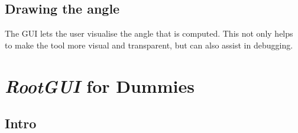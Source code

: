 \subsection{Drawing the angle}
The GUI lets the user visualise the angle that is computed. This not only helps to make the tool more visual and transparent, but can also assist in debugging. 



%


\section{\textit{RootGUI} for Dummies}


\subsection{Intro}

